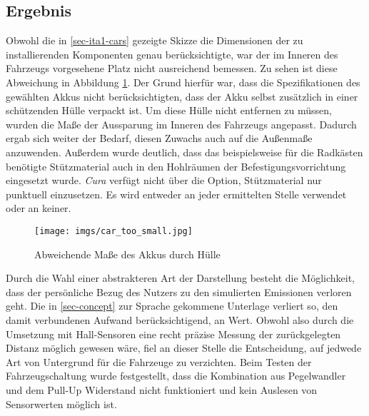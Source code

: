 \documentclass[.../Dokumentation.tex]{subfiles}
\begin{document}
\subsection{Ergebnis}\label{sec-ita1-result}
Obwohl die in \ref{sec-ita1-cars} gezeigte Skizze die Dimensionen der zu 
installierenden Komponenten genau berücksichtigte, war der im Inneren des 
Fahrzeugs vorgesehene Platz nicht ausreichend bemessen.
Zu sehen ist diese Abweichung in Abbildung \ref{fig-car-too-small}.
Der Grund hierfür war, dass die Spezifikationen des gewählten Akkus nicht 
berücksichtigten, dass der Akku selbst zusätzlich in einer schützenden Hülle 
verpackt ist. 
Um diese Hülle nicht entfernen zu müssen, wurden die 
Maße der Aussparung im Inneren des Fahrzeugs angepasst. Dadurch ergab 
sich weiter der Bedarf, diesen Zuwachs auch auf die Außenmaße anzuwenden. 
Außerdem wurde deutlich, dass das beispielsweise für die Radkästen benötigte
Stütz\-material auch in den Hohlräumen der Befestigungsvorrichtung 
eingesetzt wurde. \textit{Cura} verfügt nicht über die Option, Stützmaterial nur 
punktuell einzusetzen. Es wird entweder an jeder ermittelten Stelle verwendet 
oder an keiner. 
\begin{figure}[H]
    \begin{center}
    \texttt{[image: imgs/car\_too\_small.jpg]}
    \caption{Abweichende Maße des Akkus durch Hülle}
    \label{fig-car-too-small}
    \end{center}
\end{figure}
\noindent
Durch die Wahl einer abstrakteren Art der Darstellung besteht die Möglichkeit, 
dass der persönliche Bezug des Nutzers zu den simulierten Emissionen verloren 
geht.
Die in \ref{sec-concept} zur Sprache gekommene Unterlage verliert so, den damit 
verbundenen Aufwand berücksichtigend, an Wert.
Obwohl also durch die Umsetzung mit Hall-Sensoren 
eine recht präzise Messung der zurückgelegten Distanz möglich gewesen wäre, 
fiel an dieser Stelle die Entscheidung, auf jedwede Art von Untergrund 
für die Fahrzeuge zu verzichten. 
Beim Testen der Fahrzeugschaltung wurde festgestellt, dass die Kombination aus Pegelwandler und dem Pull-Up Widerstand nicht funktioniert und kein Auslesen von Sensorwerten möglich ist.
\end{document}
